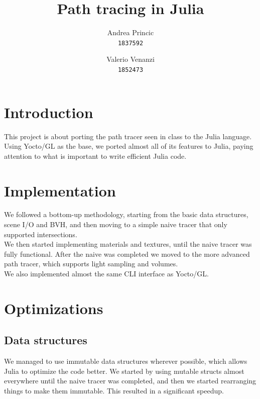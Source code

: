 \documentclass[12pt]{report}
\title{Path tracing in Julia}
\author{
    Andrea Princic\\
    \texttt{1837592}
    \and
    Valerio Venanzi\\
    \texttt{1852473}
}
\begin{document}
    \maketitle


    \section*{Introduction}\label{sec:introduction}
    This project is about porting the path tracer seen in class to the Julia language.
    Using Yocto/GL as the base, we ported almost all of its features to Julia,
    paying attention to what is important to write efficient Julia code.


    \section*{Implementation}\label{sec:implementation}
    We followed a bottom-up methodology, starting from the basic data structures, scene I/O and BVH,
    and then moving to a simple naive tracer that only supported intersections.\\
    We then started implementing materials and textures, until the naive tracer was fully functional.
    After the naive was completed we moved to the more advanced path tracer, which supports light sampling and volumes.\\
    We also implemented almost the same CLI interface as Yocto/GL\@.


    \section*{Optimizations}\label{sec:optimizations}
    \subsection*{Data structures}\label{subsec:optimizations-data-structures}
    We managed to use immutable data structures wherever possible, which allows Julia to optimize the code better.
    We started by using mutable structs almost everywhere until the naive tracer was completed, and then we started
    rearranging things to make them immutable.
    This resulted in a significant speedup.
\end{document}
